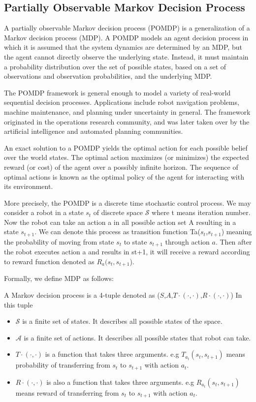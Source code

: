 \documentclass[officiallayout]{tktla}
\begin{document}
\subsection{Partially Observable Markov Decision Process}
A partially observable Markov decision process (POMDP) is a generalization of a Markov decision process (MDP). A POMDP models an agent decision process in which it is assumed that the system dynamics are determined by an MDP, but the agent cannot directly observe the underlying state. Instead, it must maintain a probability distribution over the set of possible states, based on a set of observations and observation probabilities, and the underlying MDP.

The POMDP framework is general enough to model a variety of real-world sequential decision processes. Applications include robot navigation problems, machine maintenance, and planning under uncertainty in general. The framework originated in the operations research community, and was later taken over by the artificial intelligence and automated planning communities.

An exact solution to a POMDP yields the optimal action for each possible belief over the world states. The optimal action maximizes (or minimizes) the expected reward (or cost) of the agent over a possibly infinite horizon. The sequence of optimal actions is known as the optimal policy of the agent for interacting with its environment.

More precisely, the POMDP is a discrete time stochastic control process. We may consider a robot in a state $s_t$ of discrete space $\mathcal{S}$ where t means iteration number. Now the robot can take an action a in all possible action set A resulting in a state $s_{t+1}$. We can denote this process as transition function Ta($s_t$,$s_{t+1}$) meaning the probability of moving from state $s_t$ to state $s_{t+1}$ through action $a$. Then after the robot executes action a and results in st+1, it will receive a reward according to reward function denoted as $R_a(s_t,s_{t+1}$).

Formally, we define MDP as follows:

A Markov decision process is a 4-tuple denoted as ($S$,$A$,$T\cdot(\cdot,\cdot)$,$R\cdot(\cdot,\cdot)$)
In this tuple
\begin{itemize}
\item	$\mathcal{S}$ is a finite set of states. It describes all possible states of the space.
\item	$\mathcal{A}$ is a finite set of actions. It describes all possible states that robot can take.
\item	$T\cdot(\cdot,\cdot)$ is a function that takes three arguments. e.g $T_{a_t}(s_t,s_{t+1})$ means probability of transferring from $s_t$ to $s_{t+1}$ with action $a_t$.
\item	$R\cdot(\cdot,\cdot)$ is also a function that takes three arguments. e.g $R_{a_t}(s_t,s_{t+1})$ means reward of transferring from $s_t$ to $s_{t+1}$ with action $a_t$.
\end{itemize}
\end{document}
